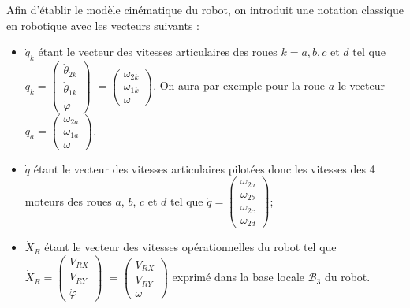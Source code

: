 \ifprof%
\begin{corrige}
\end{corrige}\else\fi


\ifprof%
\begin{corrige}
\end{corrige}\else\fi


Afin d'établir le modèle cinématique du robot, on introduit une notation classique en robotique avec les vecteurs suivants :
 \begin{itemize}
\item  $\dot{q}_k$ étant le vecteur des vitesses articulaires des roues $k=a,b,c$ et $d$ tel que $\dot{q}_k =\begin{pmatrix}
\dot{\theta}_{2k} \\ \dot{\theta}_{1k} \\ \dot{\varphi} \end{pmatrix} $ $=\begin{pmatrix}
\omega_{2k} \\ \omega_{1k} \\ \omega \end{pmatrix} $. On aura par exemple pour la roue $a$ le vecteur 
$\dot{q}_a =\begin{pmatrix}
\omega_{2a} \\ \omega_{1a} \\ \omega \end{pmatrix} $.
\item  $\dot{q}$ étant le vecteur des vitesses articulaires pilotées donc les vitesses des 4 moteurs des roues $a$, $b$, $c$ et $d$ tel que $\dot{q} =\begin{pmatrix}
\omega_{2a} \\ \omega_{2b}\\ \omega_{2c}\\ \omega_{2d}\end{pmatrix} $;
\item $\dot{X}_R$ étant le vecteur des vitesses opérationnelles du robot tel que $\dot{X}_R=\begin{pmatrix}
V_{RX} \\ V_{RY}\\ \dot{\varphi}\end{pmatrix} $ $=\begin{pmatrix}
V_{RX} \\ V_{RY}\\ \omega\end{pmatrix} $ exprimé dans la base locale $\mathcal{B}_3$ du robot.
 \end{itemize}


